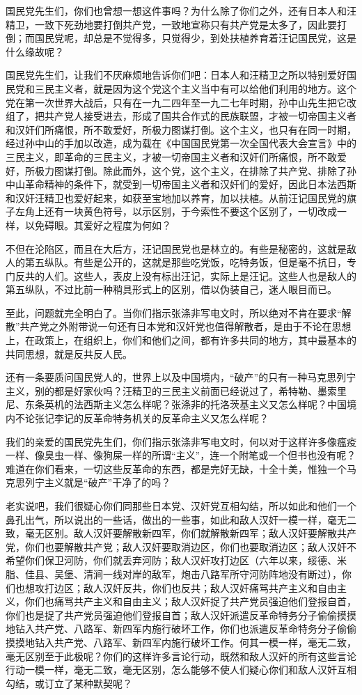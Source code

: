 国民党先生们，你们也曾想一想这件事吗？为什么除了你们之外，还有日本人和汪精卫，一致下死劲地要打倒共产党，一致地宣称只有共产党是太多了，因此要打倒；而国民党呢，却总是不觉得多，只觉得少，到处扶植养育着汪记国民党，这是什么缘故呢？

国民党先生们，让我们不厌麻烦地告诉你们吧：日本人和汪精卫之所以特别爱好国民党和三民主义者，就是因为这个党这个主义当中有可以给他们利用的地方。这个党在第一次世界大战后，只有在一九二四年至一九二七年时期，孙中山先生把它改组了，把共产党人接受进去，形成了国共合作式的民族联盟，才被一切帝国主义者和汉奸们所痛恨，所不敢爱好，所极力图谋打倒。这个主义，也只有在同一时期，经过孙中山的手加以改造，成为载在《中国国民党第一次全国代表大会宣言》中的三民主义，即革命的三民主义，才被一切帝国主义者和汉奸们所痛恨，所不敢爱好，所极力图谋打倒。除此而外，这个党，这个主义，在排除了共产党、排除了孙中山革命精神的条件下，就受到一切帝国主义者和汉奸们的爱好，因此日本法西斯和汉奸汪精卫也爱好起来，如获至宝地加以养育，加以扶植。从前汪记国民党的旗子左角上还有一块黄色符号，以示区别，于今索性不要这个区别了，一切改成一样，以免碍眼。其爱好之程度为何如？

不但在沦陷区，而且在大后方，汪记国民党也是林立的。有些是秘密的，这就是敌人的第五纵队。有些是公开的，这就是那些吃党饭，吃特务饭，但是毫不抗日，专门反共的人们。这些人，表皮上没有标出汪记，实际上是汪记。这些人也是敌人的第五纵队，不过比前一种稍具形式上的区别，借以伪装自己，迷人眼目而已。

至此，问题就完全明白了。当你们指示张涤非写电文时，所以绝对不肯在要求“解散”共产党之外附带说一句还有日本党和汉奸党也值得解散者，是由于不论在思想上，在政策上，在组织上，你们和他们之间，都有许多共同的地方，其中最基本的共同思想，就是反共反人民。

还有一条要质问国民党人的，世界上以及中国境内，“破产”的只有一种马克思列宁主义，别的都是好家伙吗？汪精卫的三民主义前面已经说过了，希特勒、墨索里尼、东条英机的法西斯主义怎么样呢？张涤非的托洛茨基主义又怎么样呢？中国境内不论张记李记的反革命特务机关的反革命主义又怎么样呢？

我们的亲爱的国民党先生们，你们指示张涤非写电文时，何以对于这样许多像瘟疫一样、像臭虫一样、像狗屎一样的所谓“主义”，连一个附笔或一个但书也没有呢？难道在你们看来，一切这些反革命的东西，都是完好无缺，十全十美，惟独一个马克思列宁主义就是“破产”干净了的吗？

老实说吧，我们很疑心你们同那些日本党、汉奸党互相勾结，所以如此和他们一个鼻孔出气，所以说出的一些话，做出的一些事，如此和敌人汉奸一模一样，毫无二致，毫无区别。敌人汉奸要解散新四军，你们就解散新四军；敌人汉奸要解散共产党，你们也要解散共产党；敌人汉奸要取消边区，你们也要取消边区；敌人汉奸不希望你们保卫河防，你们就丢弃河防；敌人汉奸攻打边区（六年以来，绥德、米脂、佳县、吴堡、清涧一线对岸的敌军，炮击八路军所守河防阵地没有断过），你们也想攻打边区；敌人汉奸反共，你们也反共；敌人汉奸痛骂共产主义和自由主义，你们也痛骂共产主义和自由主义；敌人汉奸捉了共产党员强迫他们登报自首，你们也是捉了共产党员强迫他们登报自首；敌人汉奸派遣反革命特务分子偷偷摸摸地钻入共产党、八路军、新四军内施行破坏工作，你们也派遣反革命特务分子偷偷摸摸地钻入共产党、八路军、新四军内施行破坏工作。何其一模一样，毫无二致，毫无区别至于此极呢？你们的这样许多言论行动，既然和敌人汉奸的所有这些言论行动一模一样，毫无二致，毫无区别，怎么能够不使人们疑心你们和敌人汉奸互相勾结，或订立了某种默契呢？

